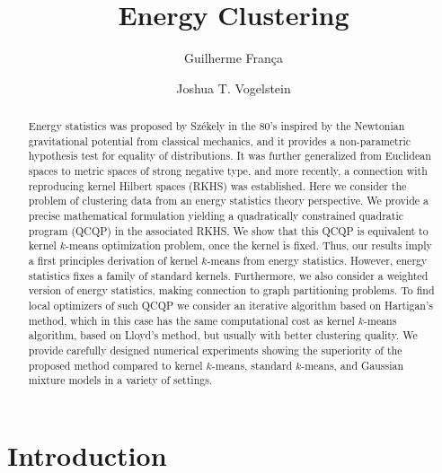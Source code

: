 \documentclass[aps,preprint,nofootinbib,floatfix]{revtex4-1}
\begin{document}
\title{Energy Clustering}

\author{Guilherme Fran\c ca}
\author{Joshua T. Vogelstein}


\begin{abstract}
Energy statistics was proposed by Sz\' ekely in the 80's inspired by the 
Newtonian gravitational potential from classical mechanics, and it provides 
a non-parametric hypothesis test for equality of distributions. 
It was further generalized from Euclidean spaces to metric spaces of 
strong negative type, and more recently, a connection with reproducing 
kernel Hilbert spaces (RKHS) was established. 
Here we consider the problem of clustering data from an 
energy statistics theory perspective.
We provide a precise mathematical formulation 
yielding a quadratically constrained 
quadratic program (QCQP) in the associated RKHS. We show that this QCQP
is equivalent to kernel $k$-means optimization problem, once the kernel
is fixed.
Thus, our results imply a first principles derivation of kernel $k$-means 
from energy statistics.
However, energy statistics fixes a family of standard kernels.
Furthermore, we also consider a weighted version of energy statistics, 
making connection to graph partitioning problems.
To find local optimizers of such QCQP we consider an iterative algorithm based 
on Hartigan's method, which in this case has the same computational cost 
as kernel $k$-means algorithm, based on Lloyd's method, but usually 
with better clustering quality. 
We provide carefully designed numerical experiments showing the superiority 
of the proposed method compared to kernel $k$-means, standard $k$-means, 
and Gaussian mixture models in a variety of settings.
\end{abstract}


\maketitle





\section{Introduction}
\end{document}
